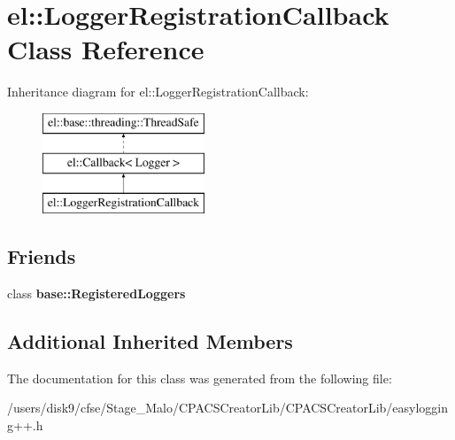 \hypertarget{classel_1_1LoggerRegistrationCallback}{\section{el\-:\-:Logger\-Registration\-Callback Class Reference}
\label{classel_1_1LoggerRegistrationCallback}
}
Inheritance diagram for el\-:\-:Logger\-Registration\-Callback\-:\begin{figure}[H]
\begin{center}
\leavevmode
\includegraphics[height=3.000000cm]{classel_1_1LoggerRegistrationCallback}
\end{center}
\end{figure}
\subsection*{Friends}
\begin{DoxyCompactItemize}
\item 
\hypertarget{classel_1_1LoggerRegistrationCallback_a5b2ecdd0901cd8ea80e03a3a6e2a9f17}{class {\bfseries base\-::\-Registered\-Loggers}}\label{classel_1_1LoggerRegistrationCallback_a5b2ecdd0901cd8ea80e03a3a6e2a9f17}

\end{DoxyCompactItemize}
\subsection*{Additional Inherited Members}


The documentation for this class was generated from the following file\-:\begin{DoxyCompactItemize}
\item 
/users/disk9/cfse/\-Stage\-\_\-\-Malo/\-C\-P\-A\-C\-S\-Creator\-Lib/\-C\-P\-A\-C\-S\-Creator\-Lib/easylogging++.\-h\end{DoxyCompactItemize}
